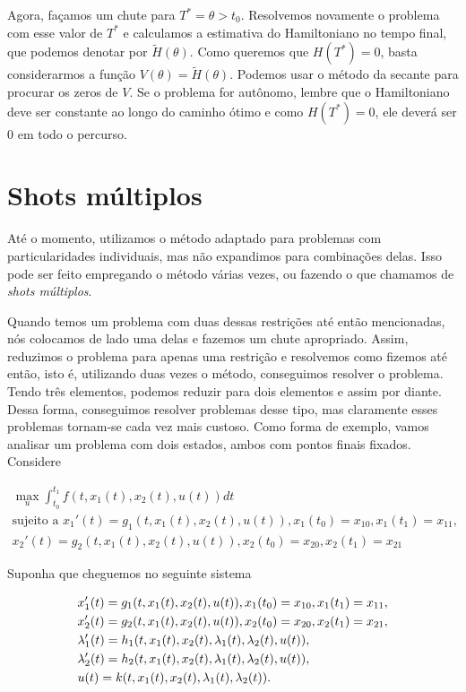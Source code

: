 Agora, façamos um chute para $T^* = \theta > t_0$. Resolvemos novamente o
problema com esse valor de $T^*$ e calculamos a estimativa do Hamiltoniano no
tempo final, que podemos denotar por $\tilde{H}(\theta)$. Como queremos que
$H(T^*) = 0$, basta considerarmos a função $V(\theta) = \tilde{H}(\theta)$. 
Podemos usar o método da secante para procurar os zeros de $V$. Se o problema
for autônomo, lembre que o Hamiltoniano deve ser constante ao longo do caminho
ótimo e como $H(T^*) = 0$, ele deverá ser $0$ em todo o percurso. 

\section{Shots múltiplos}

Até o momento, utilizamos o método adaptado para problemas com
particularidades individuais, mas não expandimos para combinações delas. Isso
pode ser feito empregando o método várias vezes, ou fazendo o que chamamos de
\textit{shots múltiplos}. 

Quando temos um problema com duas dessas restrições até então
mencionadas, nós colocamos de lado uma delas e fazemos um chute apropriado. Assim,
reduzimos o problema para apenas uma restrição e resolvemos como fizemos até
então, isto é, utilizando duas vezes o método, conseguimos resolver o problema.
Tendo três elementos, podemos reduzir para dois elementos e assim por diante.
Dessa forma, conseguimos resolver problemas desse tipo, mas claramente esses
problemas tornam-se cada vez mais custoso. Como forma de exemplo,
vamos analisar um problema com dois estados, ambos com pontos finais fixados.
Considere 

\begin{gather*}
    \max_u \int_{t_0}^{t_1} f(t, x_1(t), x_2(t), u(t)) dt \\
    \text{sujeito a }x_1'(t) = g_1(t, x_1(t), x_2(t), u(t)), x_1(t_0) = x_{10}, x_1(t_1) = x_{11}, \\
    x_2 '(t) = g_2(t, x_1(t), x_2(t), u(t)), x_2(t_0) = x_{20}, x_2(t_1) = x_{21}
\end{gather*}

Suponha que cheguemos no seguinte sistema 

\begin{align*}
    &x_1 '(t) = g_1(t, x_1(t), x_2(t), u(t)), x_1(t_0) = x_{10}, x_1(t_1) = x_{11}, \\
    &x_2 '(t) = g_2(t, x_1(t), x_2(t), u(t)), x_2(t_0) = x_{20}, x_2(t_1) = x_{21}, \\
    &\lambda_1 '(t) = h_1(t, x_1(t), x_2(t), \lambda_1(t), \lambda_2(t), u(t)), \\
    &\lambda_2 '(t) = h_2(t, x_1(t), x_2(t), \lambda_1(t), \lambda_2(t), u(t)), \\
    &u(t) = k(t, x_1(t), x_2(t), \lambda_1(t), \lambda_2(t)).
\end{align*}

